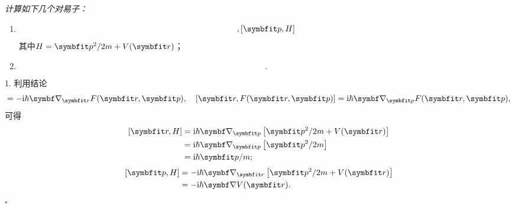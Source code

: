 \begin{tcolorbox}[breakable, title={\textbf{例题：两个对易子的计算}}]
    \it\small
    计算如下几个对易子：
    \begin{enumerate}
        \item
            \begin{equation}
                [\rr,H], [\pp,H]
            \end{equation}
            其中$H=\pp^2/2m + V(\rr)$；
        \item
        \begin{equation}
                [p^2,\frac{1}{r}].
            \end{equation}
    \end{enumerate}


    1. 利用结论
    \begin{equation}
        [\pp,F(\rr,\pp)] = -\ii\hbar\del_{\rr}F(\rr,\pp),\quad [\rr,F(\rr,\pp)] = \ii\hbar\del_{\pp}F(\rr,\pp),
    \end{equation}
    可得
    \begin{equation}
    \begin{aligned}\relax
        [\rr, H]
        &= \ii\hbar\del_{\pp}\left[\pp^2/2m + V(\rr)\right] \\
        &= \ii\hbar\del_{\pp}\left[\pp^2/2m\right] \\
        &= \ii\hbar\pp/m;
    \end{aligned}
    \end{equation}
    \begin{equation}
    \begin{aligned}\relax
        [\pp, H]
        &= -\ii\hbar\del_{\rr}\left[\pp^2/2m + V(\rr)\right] \\
        &= -\ii\hbar\del V(\rr).
    \end{aligned}
    \end{equation}
    \hfill$\square$


\end{tcolorbox}
